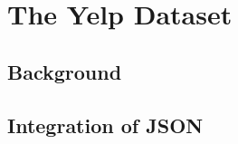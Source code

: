 \section{The Yelp Dataset} %
\label{cha:yelp}


\subsection{Background} %
\label{sec:background}


\subsection{Integration of JSON}
\label{sec:integration}